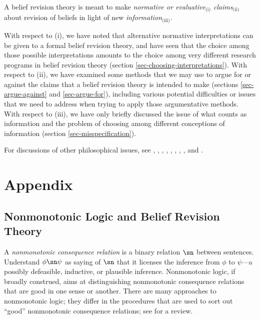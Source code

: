 	\xm A belief revision theory is meant to make \textit{normative or evaluative}$_\text{(i)}$ \textit{claims}$_\text{(ii)}$ about revision of beliefs in light of new \textit{information}$_\text{(iii)}$.

\ed With respect to (i), we have noted that alternative normative interpretations can be given to a formal belief revision theory, and have seen that the choice among those possible interpretations amounts to the choice among very different research programs in belief revision theory (section \ref{sec-choosing-interpretations}). With respect to (ii), we have examined some methods that we may use to argue for or against the claims that a belief revision theory is intended to make (sections \ref{sec-argue-against} and \ref{sec-argue-for}), including various potential difficulties or issues that we need to address when trying to apply those argumentative methods. With respect to (iii), we have only briefly discussed the issue of what counts as information and the problem of choosing among different conceptions of information (section \ref{sec-misspecification}). 


For discussions of other philosophical issues, see \citet{levi1983enterprise}, \citet{levi1991fixation}, \citet{levi2004mild}, \citet{gardenfors1988knowledge}, \citet{rott2000two}, \citet{rott2001change}, \citet{hansson1999textbook}, \citet{hansson2003ten}, and \citet{gillies2004epistemic}. 


\section{Appendix}

\subsection{Nonmonotonic Logic and Belief Revision Theory}\label{app-trans}

A {\em nonmonotonic consequence relation} is a binary relation $\sn$ between sentences. Understand $\phi \sn \psi$ as saying of $\sn$ that it licenses the inference from $\phi$ to $\psi$---a possibly defeasible, inductive, or plausible inference. Nonmonotonic logic, if broadly construed, aims at distinguishing nonmonotonic consequence relations that are good in one sense or another. There are many approaches to nonmonotonic logic; they differ in the procedures that are used to sort out ``good'' nonmonotonic consequence relations; see \citet*{brewka2008nonmonotonic} for a review.

